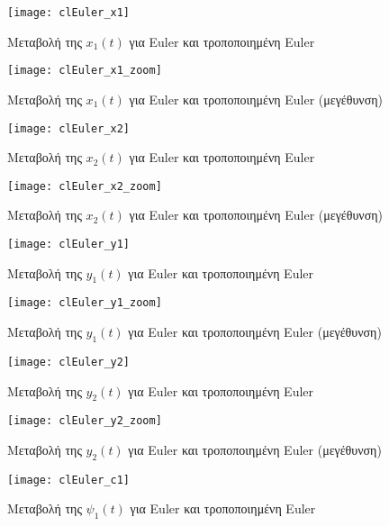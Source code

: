 \documentclass{article}
\begin{document}
\clearpage

\begin{figure}[bh!]
 \centering
\texttt{[image: clEuler\_x1]}
\caption{Μεταβολή της $x_1(t)$ για Euler και τροποποιημένη
 Euler}
\end{figure}

\begin{figure}[h!]
 \centering
\texttt{[image: clEuler\_x1\_zoom]}
\caption{Μεταβολή της $x_1(t)$ για Euler και τροποποιημένη Euler (μεγέθυνση)}
\end{figure}
\clearpage

\begin{figure}[bh!]
 \centering
\texttt{[image: clEuler\_x2]}
\caption{Μεταβολή της $x_2(t)$ για Euler και τροποποιημένη
 Euler}
\end{figure}

\begin{figure}[h!]
 \centering
\texttt{[image: clEuler\_x2\_zoom]}
\caption{Μεταβολή της $x_2(t)$ για Euler και τροποποιημένη Euler (μεγέθυνση)}
\end{figure}
\clearpage

\begin{figure}[bh!]
 \centering
\texttt{[image: clEuler\_y1]}
\caption{Μεταβολή της $y_1(t)$ για Euler και τροποποιημένη
 Euler}
\end{figure}

\begin{figure}[h!]
 \centering
\texttt{[image: clEuler\_y1\_zoom]}
\caption{Μεταβολή της $y_1(t)$ για Euler και τροποποιημένη Euler (μεγέθυνση)}
\end{figure}
\clearpage

\begin{figure}[bh!]
 \centering
\texttt{[image: clEuler\_y2]}
\caption{Μεταβολή της $y_2(t)$ για Euler και τροποποιημένη
 Euler}
\end{figure}

\begin{figure}[h!]
 \centering
\texttt{[image: clEuler\_y2\_zoom]}
\caption{Μεταβολή της $y_2(t)$ για Euler και τροποποιημένη Euler (μεγέθυνση)}
\end{figure}
\clearpage

\begin{figure}[bh!]
 \centering
\texttt{[image: clEuler\_c1]}
\caption{Μεταβολή της $\psi_1(t)$ για Euler και τροποποιημένη
 Euler}
\end{figure}
\end{document}
